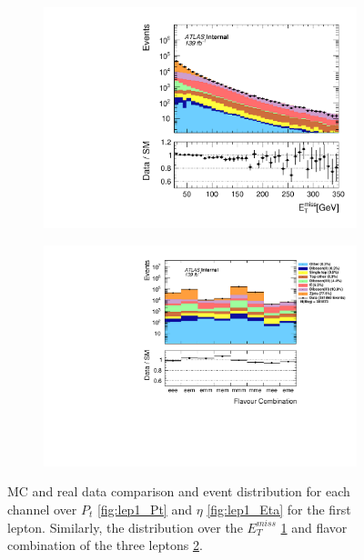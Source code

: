 \begin{figure}
{\begin{subfigure}{.405\textwidth}
        \includegraphics[width=\textwidth]{Figures/FeaturesHistograms/MCvsData/met_Et.pdf}
        \caption{}
        \label{fig:met_Et}
    \end{subfigure}
    \hfill
    \begin{subfigure}{.525\textwidth}
        \includegraphics[width=\textwidth]{Figures/FeaturesHistograms/MCvsData/flcomp.pdf}
        \caption{}
        \label{fig:flcomp}
    \end{subfigure}
    }
    \caption{\ac{MC} and real data comparison and event distribution for each channel over $P_t$ \ref{fig:lep1_Pt} and 
    $\eta$ \ref{fig:lep1_Eta} for the first lepton. Similarly, the distribution over the $E_T^{miss}$ \ref{fig:met_Et}
    and flavor combination of the three leptons \ref{fig:flcomp}.}
    \label{fig:Dist1}
\end{figure}